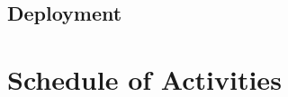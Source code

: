 \documentclass{article}
\begin{document}
\subsection{Deployment}

\section{Schedule of Activities}
\label{sec:schedule}



\printbibliography 
\end{document}
